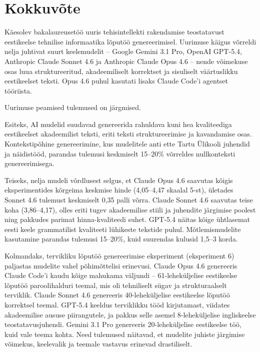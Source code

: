 \section{Kokkuvõte} \label{kokkuvote}

Käesolev bakalaureusetöö uuris tehisintellekti rakendamise teostatavust eestikeelse tehnilise informaatika lõputöö genereerimisel. Uurimuse käigus võrreldi nelja juhtivat suurt keelemudelit -- Google Gemini 3.1 Pro, OpenAI GPT-5.4, Anthropic Claude Sonnet 4.6 ja Anthropic Claude Opus 4.6 -- nende võimekuse osas luua struktureeritud, akadeemiliselt korrektset ja sisuliselt väärtuslikku eestikeelset teksti. Opus 4.6 puhul kasutati lisaks Claude Code'i agentset tööriista.

Uurimuse peamised tulemused on järgmised.

Esiteks, AI mudelid suudavad genereerida rahuldava kuni hea kvaliteediga eestikeelset akadeemilist teksti, eriti teksti struktureerimise ja kavandamise osas. Kontekstipõhine genereerimine, kus mudelitele anti ette Tartu Ülikooli juhendid ja näidistööd, parandas tulemusi keskmiselt 15--20\% võrreldes nullkonteksti genereerimisega.

Teiseks, nelja mudeli võrdlusest selgus, et Claude Opus 4.6 saavutas kõigis eksperimentides kõrgeima keskmise hinde (4,05--4,47 skaalal 5-st), ületades Sonnet 4.6 tulemust keskmiselt 0,35 palli võrra. Claude Sonnet 4.6 saavutas teise koha (3,86--4,17), olles eriti tugev akadeemilise stiili ja juhendite järgimise poolest ning pakkudes parimat hinna-kvaliteedi suhet. GPT-5.4 näitas kõige ühtlasemat eesti keele grammatilist kvaliteeti lühikeste tekstide puhul. Mõtlemismudelite kasutamine parandas tulemusi 15--20\%, kuid suurendas kulusid 1,5--3 korda.

Kolmandaks, tervikliku lõputöö genereerimise eksperiment (eksperiment 6) paljastas mudelite vahel põhimõttelisi erinevusi. Claude Opus 4.6 genereeris Claude Code'i kaudu kõige mahukama väljundi -- 61-leheküljelise eestikeelse lõputöö paroolihalduri teemal, mis oli tehniliselt sügav ja strukturaalselt terviklik. Claude Sonnet 4.6 genereeris 40-leheküljelise eestikeelse lõputöö korrektsel teemal. GPT-5.4 keeldus terviklikku tööd kirjutamast, viidates akadeemilise aususe piirangutele, ja pakkus selle asemel 8-leheküljelise ingliskeelse teostatavusjuhendi. Gemini 3.1 Pro genereeris 20-leheküljelise eestikeelse töö, kuid vale teema kohta. Need tulemused näitavad, et mudelite juhiste järgimise võimekus, keelevalik ja teemale vastavus erinevad drastiliselt.

